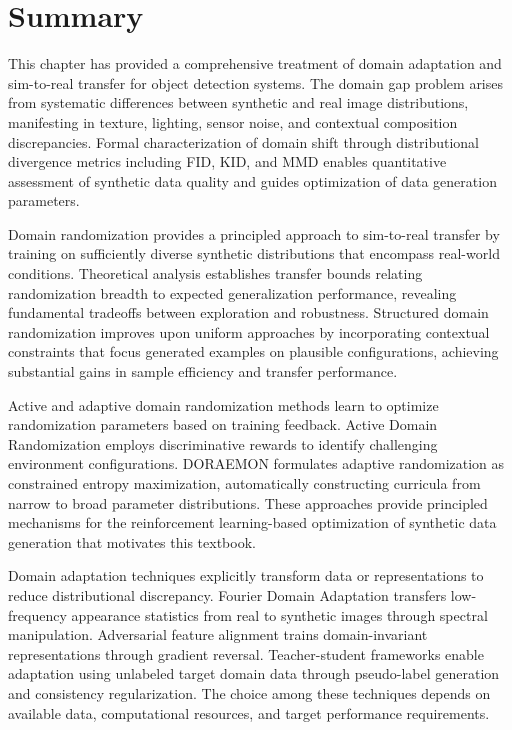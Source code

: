 \section{Summary}

This chapter has provided a comprehensive treatment of domain adaptation and sim-to-real transfer for object detection systems. The domain gap problem arises from systematic differences between synthetic and real image distributions, manifesting in texture, lighting, sensor noise, and contextual composition discrepancies. Formal characterization of domain shift through distributional divergence metrics including FID, KID, and MMD enables quantitative assessment of synthetic data quality and guides optimization of data generation parameters.

Domain randomization provides a principled approach to sim-to-real transfer by training on sufficiently diverse synthetic distributions that encompass real-world conditions. Theoretical analysis establishes transfer bounds relating randomization breadth to expected generalization performance, revealing fundamental tradeoffs between exploration and robustness. Structured domain randomization improves upon uniform approaches by incorporating contextual constraints that focus generated examples on plausible configurations, achieving substantial gains in sample efficiency and transfer performance.

Active and adaptive domain randomization methods learn to optimize randomization parameters based on training feedback. Active Domain Randomization employs discriminative rewards to identify challenging environment configurations. DORAEMON formulates adaptive randomization as constrained entropy maximization, automatically constructing curricula from narrow to broad parameter distributions. These approaches provide principled mechanisms for the reinforcement learning-based optimization of synthetic data generation that motivates this textbook.

Domain adaptation techniques explicitly transform data or representations to reduce distributional discrepancy. Fourier Domain Adaptation transfers low-frequency appearance statistics from real to synthetic images through spectral manipulation. Adversarial feature alignment trains domain-invariant representations through gradient reversal. Teacher-student frameworks enable adaptation using unlabeled target domain data through pseudo-label generation and consistency regularization. The choice among these techniques depends on available data, computational resources, and target performance requirements.


